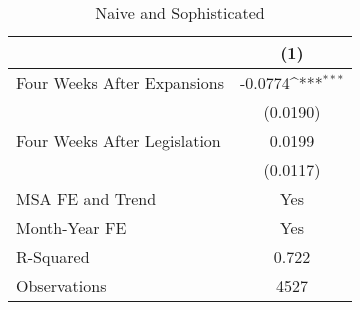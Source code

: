 \begin{table}[htbp]\centering
\def\sym#1{\ifmmode^{#1}\else\(^{#1}\)\fi}
\caption{Naive and Sophisticated\label{naive}}
\begin{tabular}{l*{1}{c}}
\hline\hline
                    &\multicolumn{1}{c}{(1)}         \\
\hline
Four Weeks After Expansions&     -0.0774\sym{***}\\
                    &    (0.0190)         \\
[1em]
Four Weeks After Legislation&      0.0199         \\
                    &    (0.0117)         \\
\hline
MSA FE and Trend    &         Yes         \\
Month-Year FE       &         Yes         \\
R-Squared           &       0.722         \\
Observations        &        4527         \\
\hline\hline
\end{tabular}
\end{table}
